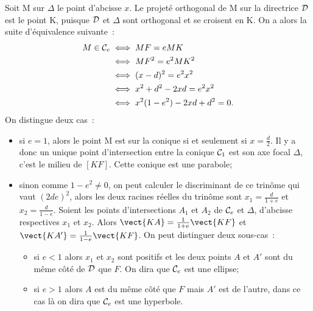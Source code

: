 Soit M sur $\Delta$ le point d'abcisse $x$. Le projeté orthogonal de M sur la directrice $\mathcal{D}$ est le point K, puisque $\mathcal{D}$ et $\Delta$ sont orthogonal et se croisent en K. On a alors la suite d'équivalence suivante~:
\begin{align}
  M \in \mathcal{C}_e &\iff MF = e MK \\
  &\iff MF^2=e^2 MK^2 \\
  &\iff (x-d)^2=e^2 x^2\\
  &\iff x^2+d^2-2xd=e^2 x^2\\
  &\iff x^2(1-e^2)-2xd+d^2=0.
\end{align}
On distingue deux cas~:
\begin{itemize}
\item si $e=1$, alors le point M est sur la conique si et seulement si $x=\frac{d}{2}$. Il y a donc un unique point d'intersection entre la conique $\mathcal{C}_1$ est son axe focal $\Delta$, c'est le milieu de $[KF]$. Cette conique est une parabole;
\item sinon comme $1-e^2 \neq 0$, on peut calculer le discriminant de ce trinôme qui vaut $(2de)^2$, alors les deux racines réelles du trinôme sont $x_1=\frac{d}{1+e}$ et $x_2=\frac{d}{1-e}$. Soient les points d'intersections $A_1$ et $A_2$ de $\mathcal{C}_e$ et $\Delta$, d'abcisse respectives $x_1$ et $x_2$. Alors $\vect{KA}=\frac{1}{1+e} \vect{KF}$ et $\vect{KA'}=\frac{1}{1-e} \vect{KF}$. On peut distinguer deux sous-cas~:
  \begin{itemize}
  \item si $e<1$ alors $x_1$ et $x_2$ sont positifs et les deux points $A$ et $A'$ sont du même côté de $\mathcal{D}$ que $F$. On dira que $\mathcal{C}_e$ est une ellipse;
  \item si $e>1$ alors $A$ est du même côté que $F$ mais $A'$ est de l'autre, dans ce cas là on dira que $\mathcal{C}_e$ est une hyperbole.
  \end{itemize}
\end{itemize}


